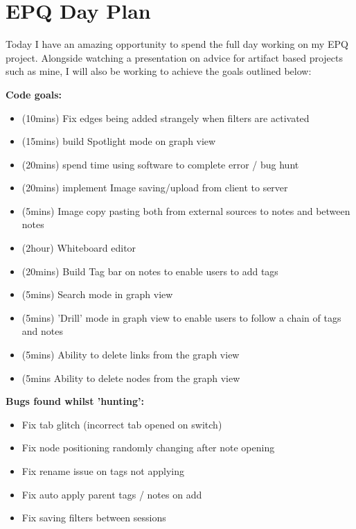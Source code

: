 \section{EPQ Day Plan}
\label{planning:EPQDayPlan}
Today I have an amazing opportunity to spend the full day working on my EPQ project. Alongside watching a presentation on advice for artifact based projects such as mine, I will also be working to achieve the goals outlined below:

\textbf{Code goals:}
\begin{itemize}
    \item (10mins) Fix edges being added strangely when filters are activated   
    \item (15mins) build Spotlight mode on graph view
    \item (20mins) spend time using software to complete error / bug hunt
    \item (20mins) implement Image saving/upload from client to server
    \item (5mins) Image copy pasting both from external sources to notes and between notes
    \item (2hour) Whiteboard editor
    \item (20mins) Build Tag bar on notes to enable users to add tags
    \item (5mins) Search mode in graph view
    \item (5mins) 'Drill' mode in graph view to enable users to follow a chain of tags and notes
    \item (5mins) Ability to delete links from the graph view
    \item (5mins Ability to delete nodes from the graph view
\end{itemize}

\textbf{Bugs found whilst 'hunting':}
\begin{itemize}
    \item Fix tab glitch (incorrect tab opened on switch)
    \item Fix node positioning randomly changing after note opening
    \item Fix rename issue on tags not applying
    \item Fix auto apply parent tags / notes on add
    \item Fix saving filters between sessions
\end{itemize}

